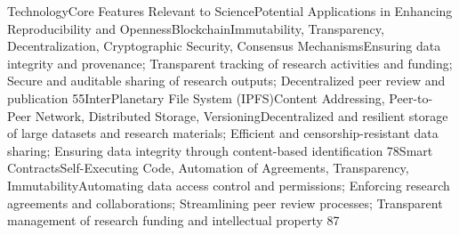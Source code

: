 \documentclass{article}
\begin{document}
TechnologyCore Features Relevant to SciencePotential Applications in Enhancing Reproducibility and OpennessBlockchainImmutability, Transparency, Decentralization, Cryptographic Security, Consensus MechanismsEnsuring data integrity and provenance; Transparent tracking of research activities and funding; Secure and auditable sharing of research outputs; Decentralized peer review and publication 55InterPlanetary File System (IPFS)Content Addressing, Peer-to-Peer Network, Distributed Storage, VersioningDecentralized and resilient storage of large datasets and research materials; Efficient and censorship-resistant data sharing; Ensuring data integrity through content-based identification 78Smart ContractsSelf-Executing Code, Automation of Agreements, Transparency, ImmutabilityAutomating data access control and permissions; Enforcing research agreements and collaborations; Streamlining peer review processes; Transparent management of research funding and intellectual property 87
\end{document}
